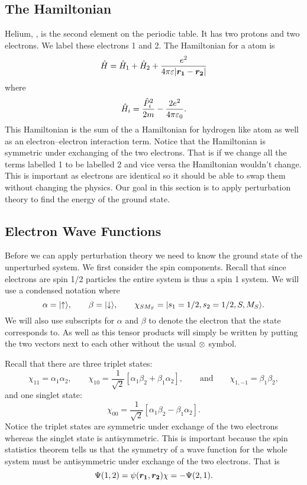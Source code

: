    \subsection{The Hamiltonian}
    Helium, , is the second element on the periodic table.
    It has two protons and two electrons.
    We label these electrons 1 and 2.
    The Hamiltonian for a  atom is
    \[\hat{H} = \hat{H}_1 + \hat{H}_2 + \frac{e^2}{4\pi\varepsilon\abs{\bm{r_1} - \bm{r_2}}}\]
    where
    \[\hat{H}_i = \frac{\hat{P}_i^2}{2m} - \frac{2e^2}{4\pi\varepsilon_0}.\]
    This Hamiltonian is the sum of the a Hamiltonian for hydrogen like atom as well as an electron--electron interaction term.
    Notice that the Hamiltonian is symmetric under exchanging of the two electrons.
    That is if we change all the terms labelled 1 to be labelled 2 and vice versa the Hamiltonian wouldn't change.
    This is important as electrons are identical so it should be able to swap them without changing the physics.
    Our goal in this section is to apply perturbation theory to find the energy of the ground state.
    
    \subsection{Electron Wave Functions}
    Before we can apply perturbation theory we need to know the ground state of the unperturbed system.
    We first consider the spin components.
    Recall that since electrons are spin 1/2 particles the entire system is thus a spin 1 system.
    We will use a condensed notation where
    \[\alpha = \vert {\uparrow} \rangle, \qquad \beta = \vert {\downarrow} \rangle, \qquad \chi_{SM_S} = \vert {s_1 = 1/2, s_2 = 1/2, S, M_S} \rangle.\]
    We will also use subscripts for \(\alpha\) and \(\beta\) to denote the electron that the state corresponds to.
    As well as this tensor products will simply be written by putting the two vectors next to each other without the usual \(\otimes\) symbol.
    
    Recall that there are three triplet states:
    \[\chi_{11} = \alpha_1\alpha_2, \qquad \chi_{10} = \frac{1}{\sqrt{2}}[\alpha_1\beta_2 + \beta_1\alpha_2], \qquad\text{and}\qquad \chi_{1,-1} = \beta_1\beta_2,\]
    and one singlet state:
    \[\chi_{00} = \frac{1}{\sqrt{2}}[\alpha_1\beta_2 - \beta_1\alpha_2].\]
    Notice the triplet states are symmetric under exchange of the two electrons whereas the singlet state is antisymmetric.
    This is important because the spin statistics theorem tells us that the symmetry of a wave function for the whole system must be antisymmetric under exchange of the two electrons.
    That is
    \[\Psi(1, 2) = \psi(\bm{r_1}, \bm{r_2})\chi = -\Psi(2, 1).\]
    
